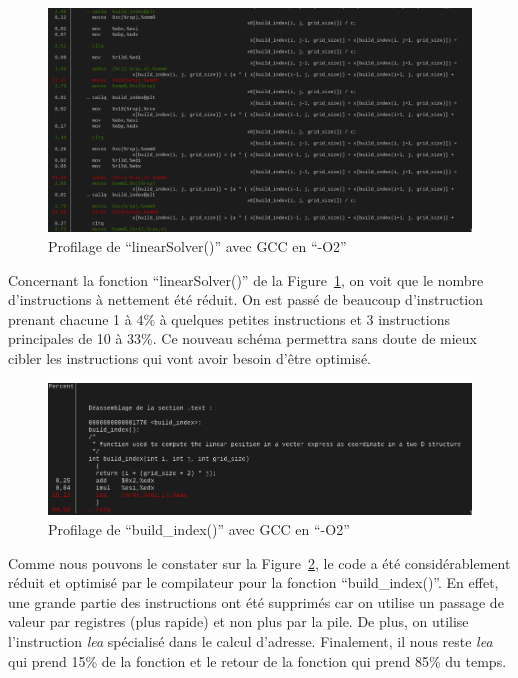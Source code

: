 \documentclass[12pt,a4paper]{article}
\begin{document}
\begin{figure}
    \centering
    \includegraphics[scale=0.35]{figures/optims/gcc-O2/linearSolver.png}
    \caption{Profilage de \enquote{linearSolver()} avec \ac{GCC} en \enquote{-O2}}
    \label{fig.optim.compil.gcc.linearSolver}
\end{figure}

Concernant la fonction \enquote{linearSolver()} de la
Figure~\ref{fig.optim.compil.gcc.linearSolver}, on voit que le nombre
d’instructions à nettement été réduit. On est passé de beaucoup d’instruction
prenant chacune 1 à $4\%$ à quelques petites instructions et 3 instructions
principales de 10 à 33\%. Ce nouveau schéma permettra sans doute de mieux cibler
les instructions qui vont avoir besoin d’être optimisé.

\begin{figure}
    \centering
    \includegraphics[scale=0.4]{figures/optims/gcc-O2/build_index.png}
    \caption{Profilage de \enquote{build\_index()} avec \ac{GCC} en \enquote{-O2}}
    \label{fig.optim.compil.gcc.build_index}
\end{figure}

Comme nous pouvons le constater sur la
Figure~\ref{fig.optim.compil.gcc.build_index}, le code a été considérablement
réduit et optimisé par le compilateur pour la fonction \enquote{build\_index()}.
En effet, une grande partie des instructions ont été supprimés car on utilise un
passage de valeur par registres (plus rapide) et non plus par la pile. De plus,
on utilise l’instruction \textit{lea} spécialisé dans le calcul d’adresse.
Finalement, il nous reste \textit{lea} qui prend 15\% de la fonction et le
retour de la fonction qui prend 85\% du temps.
\end{document}

